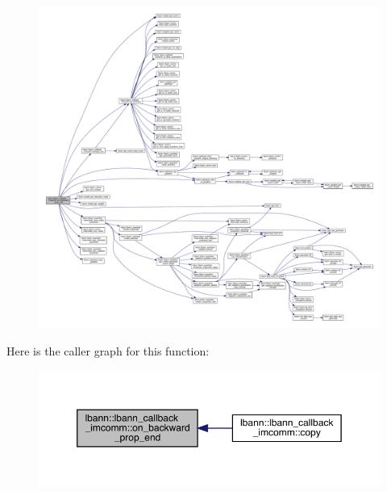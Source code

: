 \begin{figure}[H]
\begin{center}
\leavevmode
\includegraphics[width=350pt]{classlbann_1_1lbann__callback__imcomm_a0a425ba562f7637b25cd6ba094e7885b_cgraph}
\end{center}
\end{figure}
Here is the caller graph for this function\+:\nopagebreak
\begin{figure}[H]
\begin{center}
\leavevmode
\includegraphics[width=350pt]{classlbann_1_1lbann__callback__imcomm_a0a425ba562f7637b25cd6ba094e7885b_icgraph}
\end{center}
\end{figure}
\mbox{\label{classlbann_1_1lbann__callback__imcomm_a3160dbf536def4f930e0ea0aabdebc11}} 
